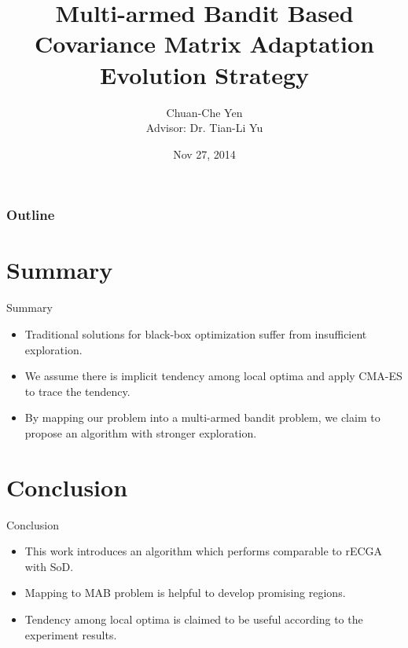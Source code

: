 \documentclass{beamer}
\title[MAB-based CMA-ES]{Multi-armed Bandit Based Covariance Matrix Adaptation
Evolution Strategy}
\author[Chuan-Che Yen]{Chuan-Che Yen \\Advisor: Dr. Tian-Li Yu}
\institute{TEILab}
\date{Nov 27, 2014}
\begin{document}
\begin{frame}
  \titlepage
\end{frame}
\begin{frame}
  \frametitle{Outline}
  \tableofcontents[
    currentsubsection,
    sectionstyle=show/show,
    subsectionstyle=show/hide,
  ]
\end{frame}



%
%




\section{Summary}
\begin{frame}{Summary}

  \begin{itemize}
    \item Traditional solutions for black-box optimization suffer from
      insufficient exploration.
    \item We assume there is implicit tendency among local optima and
      apply CMA-ES to trace the tendency.
    \item By mapping our problem into a multi-armed bandit problem, we
      claim to propose an algorithm with stronger exploration.
  \end{itemize}
\end{frame}

\section{Conclusion}
\begin{frame}{Conclusion}
  \begin{itemize}
    \item This work introduces an algorithm which performs comparable to
      rECGA with SoD.
    \item Mapping to MAB problem is helpful to develop promising
      regions. 
    \item Tendency among local optima is claimed to be useful according to
      the experiment results.
  \end{itemize}
\end{frame}
\end{document}
